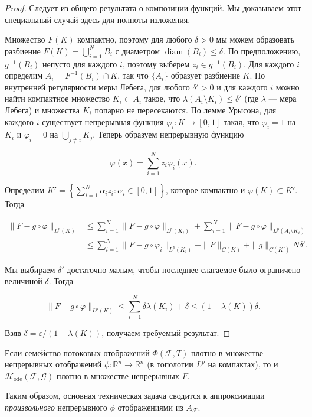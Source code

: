 \documentclass[../NDCNNAI_main.tex]{subfiles}
\begin{document}
\begin{proof}
Следует из общего результата о композиции функций. 
Мы доказываем этот специальный случай здесь для полноты изложения.

Множество \( F(K) \) компактно, поэтому для любого \( \delta > 0 \) мы можем образовать разбиение 
\( F(K) = \bigcup_{i=1}^{N} B_i \) с диаметром \( \operatorname{diam}(B_i) \leq \delta \). 
По предположению, \( g^{-1}(B_i) \) непусто для каждого \( i \), поэтому выберем 
\( z_i \in g^{-1}(B_i) \). Для каждого \( i \) определим \( A_i = F^{-1}(B_i) \cap K \), 
так что \(\{A_i\}\) образует разбиение \( K \). 
По внутренней регулярности меры Лебега, для любого \( \delta' > 0 \) и для каждого \( i \) 
можно найти компактное множество \( K_i \subset A_i \) такое, что 
\( \lambda(A_i \setminus K_i) \leq \delta' \) (где \( \lambda \) --- мера Лебега) 
и множества \( K_i \) попарно не пересекаются. 
По лемме Урысона, для каждого \( i \) существует непрерывная функция 
\( \varphi_i : K \to [0,1] \) такая, что \( \varphi_i = 1 \) на \( K_i \) и 
\( \varphi_i = 0 \) на \( \bigcup_{j \neq i} K_j \). 
Теперь образуем непрерывную функцию

\[
\varphi(x) = \sum_{i=1}^{N} z_i \varphi_i(x).
\]

Определим \( K' = \left\{\sum_{i=1}^{N} \alpha_i z_i : \alpha_i \in [0,1]\right\} \), 
которое компактно и \( \varphi(K) \subset K' \). Тогда

\begin{align*}
\|F - g \circ \varphi\|_{L^p(K)} 
&\leq \sum_{i=1}^{N} \|F - g \circ \varphi\|_{L^p(K_i)} 
   + \sum_{i=1}^{N} \|F - g \circ \varphi\|_{L^p(A_i \setminus K_i)} \\
&\leq \sum_{i=1}^{N} \|F - g \circ \varphi_i\|_{L^p(K_i)} 
   + \|F\|_{C(K)} + \|g\|_{C(K')} N \delta'.
\end{align*}

Мы выбираем \( \delta' \) достаточно малым, чтобы последнее слагаемое было ограничено величиной \( \delta \). Тогда

\[
\|F - g \circ \varphi\|_{L^p(K)} \leq \sum_{i=1}^{N} \delta \lambda(K_i) + \delta 
\leq (1 + \lambda(K)) \delta.
\]

Взяв \( \delta = \varepsilon / (1 + \lambda(K)) \), получаем требуемый результат.
\end{proof}

\begin{corollary}
\label{cor:reduction_corollary}
Если семейство потоковых отображений $\Phi(\mathcal{F}, T)$ плотно в множестве непрерывных отображений $\phi: \mathbb{R}^n \to \mathbb{R}^n$ (в топологии $L^p$ на компактах), то и $\mathcal{H}_{\text{ode}}(\mathcal{F}, \mathcal{G})$ плотно в множестве непрерывных $F$.
\end{corollary}
Таким образом, основная техническая задача сводится к аппроксимации \emph{произвольного} непрерывного $\phi$ отображениями из $A_{\mathcal{F}}$.
\end{document}
